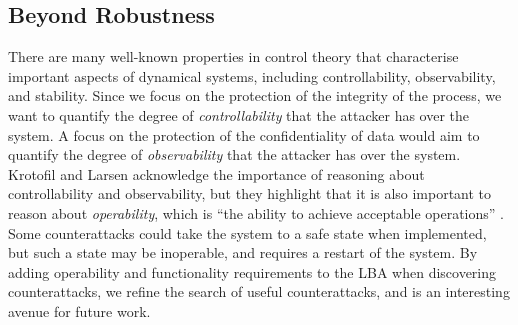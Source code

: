 {%


\subsection{Beyond Robustness}
There are many well-known properties in control theory that characterise important aspects of dynamical systems, including {controllability, observability, and stability}. Since we focus on the protection of the integrity of the process, we want to quantify the degree of \emph{controllability} that the attacker has over the system. A focus on the protection of the confidentiality of data would aim to quantify the degree of \emph{observability} that the attacker has over the system. Krotofil and Larsen acknowledge the importance of reasoning about {controllability} and {observability}, but they highlight that it is also important to reason about \emph{operability}, which is ``the ability to achieve acceptable operations'' \cite{krotofil2015rocking}. Some counterattacks could take the system to a safe state when implemented, but such a state may be inoperable, and requires a restart of the system. By adding operability and functionality requirements to the LBA when discovering counterattacks, we refine the search of useful counterattacks, and is an interesting avenue for future work. 
 
}
